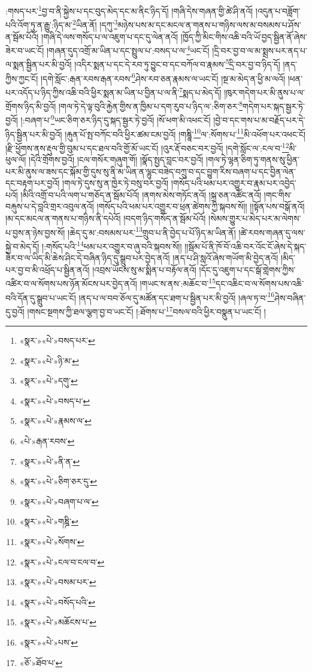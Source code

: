 :གསད་པར་\footnote{«སྣར་»«པེ་»བསད་པར་}བྱ་བ་ནི་སྐྱེས་པ་དང་བུད་མེད་དང་མ་ནིང་ཉིད་དོ། །གཞི་དེས་གཞན་གྱི་ཚེ་ཤི་ནའོ། །འདུན་པ་བཟློག་པའི་འོག་ཏུ་ན་རྒྱུ་:ཉིད་མ་\footnote{«སྣར་»«པེ་»ཉི་མ་}ཡིན་ནོ། །དཀུ་\footnote{«སྣར་»«པེ་»དགུ་}མཉེས་པས་མ་དང་མངལ་ན་གནས་པ་གཉིས་ལས་མ་བསམས་པ་ཤོས་ན་སྦོམ་པོའོ། །གཞི་དེ་ལས་གསོད་པ་ལ་འཇུག་པ་དང་དུ་ལེན་ནའོ། །ཁྱོད་ཀྱི་མིང་གིས་འཆི་བའི་ཡོ་བྱད་སྦྱིན་ནོ་ཞེས་ཟེར་བ་ཡང་ངོ། །གཞན་དུད་འགྲོ་མ་ཡིན་པ་དང་སྤྲུལ་པ་:བསད་པ་ལ་\footnote{«སྣར་»«པེ་»བསད་པ་}ཡང་ངོ། །དྲི་བར་བྱ་བ་ལ་མ་སྨྲས་པར་ནད་པ་ལ་སྨན་སྦྱིན་པར་མི་བྱའོ། །འདིར་སྨན་པ་དང་དེ་རབ་ཏུ་བྱུང་བ་དང་བཀོལ་བ་རྣམས་\footnote{«སྣར་»«པེ་»རྣམས་ལ་}དྲི་བར་བྱ་བ་ཉིད་དོ། །ནད་ཀྱིས་ཀྱང་ངོ། །དགེ་སློང་:རྒན་རབས་རྒན་རབས་\footnote{«པེ་»རྒན་རབས་}ཤེས་རབ་ཅན་རྣམས་ལ་ཡང་ངོ། །སྔ་མ་མེད་ན་ཕྱི་མ་ལའོ། །ཕན་པར་འདོད་པ་ཉིད་ཀྱིས་འཆི་བའི་ཕྱིར་སྨན་མ་ཡིན་པ་བྱིན་པ་ལ་ནི་\footnote{«སྣར་»«པེ་»ནི་ན་}སྨད་པ་མེད་དོ། །ཁུར་གདེག་པར་མི་ནུས་པ་ལ་གྲོགས་ཉིད་མི་བྱའོ། །གལ་ཏེ་དེ་ལྟ་བུའི་རྐྱེན་གྱིས་ན་ཁྱིམ་པ་དག་རུབ་པ་ཉིད་ལ་:ཅིག་ཅར་\footnote{«སྣར་»«པེ་»ཅིག་ཅར་དུ་}གདེག་པར་སྐད་སྦྱར་ཏེ་བྱའོ། །:བཞག་པ་\footnote{«སྣར་»«པེ་»བཞག་པ་ལ་}ཡང་ཅིག་ཅར་ཉིད་དུ་སྐད་སྦྱར་ཏེ་བྱའོ། །སོ་ཕག་མི་འཕང་ངོ། །བྱེ་བ་དང་གས་པ་མ་བརྗོད་པར་དེ་ཉིད་སྦྱིན་པར་མི་བྱའོ། །རྐུན་པོ་སྤ་བཀོང་བའི་ཕྱིར་ཚམ་ངམ་བྱའོ། །གཎྜཱི་\footnote{«སྣར་»«པེ་»གཎྜི་}ལ་:སོགས་པ་\footnote{«སྣར་»«པེ་»སོགས་}མི་འཕོག་པར་འཕང་ངོ། །རྫི་ཕྱོགས་ནས་རྡུལ་གྱི་བུམ་པ་དང་ཐལ་བའི་གྱོ་མོ་ཡང་ངོ། །འུར་རྡོ་བཅང་བར་བྱའོ། །དགེ་སློང་ལ་:ངལ་བ་\footnote{«སྣར་»«པེ་»ངལ་བ་ངལ་བ་}མི་ཕུལ་ལོ། །དེའི་གྲོགས་བྱའོ། །ངལ་གསོར་གཞུག་གོ། །སྣོད་སྤྱད་བླང་བར་བྱའོ། །གལ་ཏེ་ལྷན་ཅིག་ཏུ་གནས་སུ་ཕྱིན་པར་མི་ནུས་ལ་ཟས་དང་སྐོམ་གྱི་དུས་སུ་ནི་མ་ཡིན་ན་ལྷུང་བཟེད་བཀྲུ་བ་དང་བྱུག་རིས་བཞག་པ་དང་བྱིན་ལེན་དང་བརྟག་པར་བྱའོ། །གལ་ཏེ་དུས་སུ་ན་ཁྱེར་ཏེ་བསུ་བར་བྱའོ། །གསོད་པའི་ཕམ་པར་འགྱུར་བ་རྣམ་པར་འབྱེད་པའོ། །མིའི་འགྲོ་བ་པའི་ལག་པ་གཅོད་ན་སྦོམ་པོའོ། །ནགས་མེས་གཏོང་ནའོ། །སྐྲ་ཅན་འཚོང་ནའོ། །གང་གིས་བརྐུས་པ་དེ་བླའི་གྲར་འབུལ་ནའོ། །གསོད་པའི་ཕམ་པར་འགྱུར་བ་ཕྲན་ཚེགས་ཀྱི་སྐབས་སོ།། །།སྟོན་པས་བསྒོ་ནའོ། །མ་དང་མངལ་ན་གནས་པ་གཉིས་ནི་དཔེའོ། །བདག་ཉིད་གསོད་ན་སྦོམ་པོའོ། །སེམས་གྱུར་པ་མེད་པར་མ་ལེགས་པ་བྱས་ན་ཉེས་བྱས་སོ། །ཆེད་དུ་མ་:བསམས་པར་\footnote{«སྣར་»«པེ་»བསམ་པར་}གྲུབ་པ་ནི་བྱེད་པ་པོ་ཉིད་མ་ཡིན་ནོ། །ཚེ་རབས་གཞན་དུ་ལས་སྐྱེ་བ་མེད་དོ། །:གསོད་པའི་\footnote{«སྣར་»«པེ་»བསོད་པའི་}ཕམ་པར་འགྱུར་བ་ཞུ་བའི་སྐབས་སོ།། །།སྦོམ་པོ་ནི་ཁོ་བོ་འཆི་བར་འོང་ངོ་ཞེས་དེ་སྐད་ཟེར་བ་ལ་ཡིད་མི་ཆེས་ཤིང་དེ་བཞིན་ཉིད་དུ་སྒྲུབ་པར་བྱེད་ནའོ། །ནད་པ་ཤི་སླའོ་ཞེས་གཡོག་མི་བྱེད་ནའོ། །མིད་པར་བྱ་བ་མི་འཕྲོད་པ་སྦྱིན་ནའོ། །འབྲས་ཡོངས་སུ་མ་སྨིན་པ་བརྟོལ་ནའོ། །དོང་དུ་འཇུག་པ་དང་སྒོ་གླེགས་ཀྱིས་འཚིར་བ་ལ་སོགས་པས་ཉོན་མོངས་པར་བྱེད་ནའོ། །གཡང་ས་ནས་:མཆོང་བ་\footnote{«སྣར་»«པེ་»མཆོངས་པ་}དང་འཆིང་བ་ལ་སོགས་པས་འཆི་བའི་དོན་དུ་སྒྲུབ་པ་ཡང་ངོ། །ནད་པ་ལ་བབ་ཅོལ་དུ་མཚོན་དང་ཐག་པ་སྦྱིན་པར་མི་བྱའོ། །ཞལ་ཏ་བ་\footnote{«སྣར་»«པེ་»པས་}ཤེས་བཞིན་དུ་བྱའོ། །གསང་སྔགས་ཀྱི་ཐལ་ལྕག་བྱ་བ་ཡང་ངོ། །:ཐོགས་པ་\footnote{«ཅོ་»ཐོབ་པ་}བསལ་བའི་ཕྱིར་བསྣུན་པ་ཡང་ངོ། །
